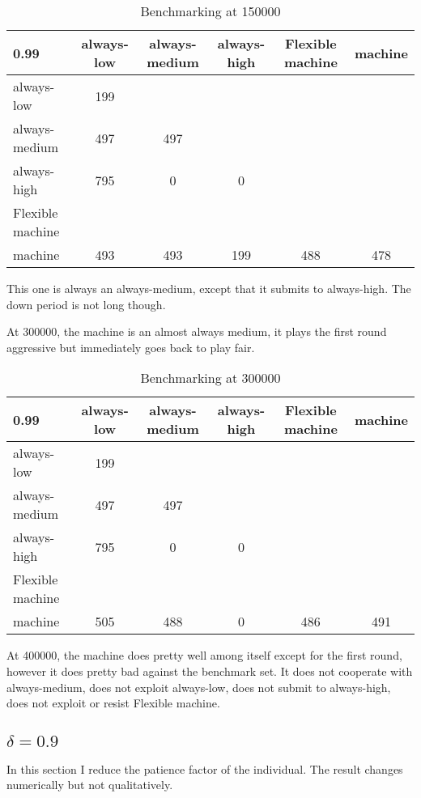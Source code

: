 \documentclass[12.5pt]{report}
\begin{document}
\begin{table}[h!]
\center
\begin{tabular}{l|ccccc}
\textbf{0.99}& always-low & always-medium & always-high & Flexible machine & machine\\
\hline
always-low    & 199 &     &    &   \\
always-medium & 497 & 497 &    & \\
always-high   & 795 &  0  & 0  & \\
Flexible machine  &     &     &    & \\
machine       & 493 &    493 & 199& 488 & 478 \\
\end{tabular}
\caption{Benchmarking at 150000}
\end{table}

This one is always an always-medium, except that it submits to always-high. The down period is not long though.

At 300000, the machine is an almost always medium, it plays the first round aggressive but immediately goes back to play fair.

\begin{table}[h!]
\center
\begin{tabular}{l|ccccc}
\textbf{0.99}& always-low & always-medium & always-high & Flexible machine & machine\\
\hline
always-low    & 199 &     &    &   \\
always-medium & 497 & 497 &    & \\
always-high   & 795 &  0  & 0  & \\
Flexible machine  &     &     &    & \\
machine       & 505 &    488 & 0& 486 & 491 \\
\end{tabular}
\caption{Benchmarking at 300000}
\end{table}

At 400000, the machine does pretty well among itself except for the first round, however it does pretty bad against the benchmark set. It does not cooperate with always-medium, does not exploit always-low, does not submit to always-high, does not exploit or resist Flexible machine.


\subsection{$\delta = 0.9$}
In this section I reduce the patience factor of the individual. The result changes numerically but not qualitatively.
\end{document}
